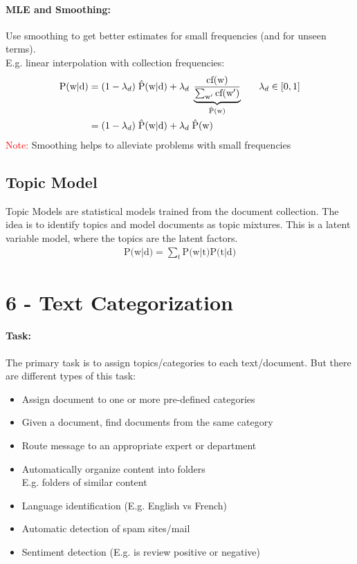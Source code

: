 \documentclass[a4paper,11pt]{article}
\newcommand{\msection}[1]{\section{#1}\vspace{-0.5mm}}
\newcommand{\cf}{\text{cf(w)}} %
\begin{document}
\begin{multicols}{2}
\paragraph{MLE and Smoothing:} Use smoothing to get better estimates for small frequencies (and for unseen terms).\\
E.g. linear interpolation with collection frequencies:
\begin{align*}
  \text{P(w$|$d)} &= (1 - \lambda_d) \; \hat{\text P}\text{(w$|$d)} + \lambda_d \; \underbrace{\frac{\cf}{\sum_{\text w'} \text{cf(w$'$)}}}_{\hat{\text P}(\text w)} \hspace{0.6cm} \lambda_d \in [0, 1] \\
                  &= (1 - \lambda_d) \; \hat{\text P}\text{(w$|$d)} + \lambda_d \; \hat{\text{P}} \text{(w)}
\end{align*}
\textcolor{red}{Note:} Smoothing helps to alleviate problems with small frequencies

\subsection{Topic Model}
Topic Models are statistical models trained from the document collection. The idea is to identify topics and model documents as topic mixtures. This is a latent variable model, where the topics are the latent factors. 
\begin{align*}
  \text{P(w$|$d)} = \sum_t \text{P(w$|$t)} \text{P(t$|$d)}
\end{align*}

\msection{6 - Text Categorization}
\paragraph{Task:} The primary task is to assign topics/categories to each text/document. But there are different types of this task:
\begin{itemize}
  \item Assign document to one or more pre-defined categories
  \item Given a document, find documents from the same category
  \item Route message to an appropriate expert or department
  \item Automatically organize content into folders\\
        E.g. folders of similar content
  \item Language identification (E.g. English vs French)
  \item Automatic detection of spam sites/mail
  \item Sentiment detection (E.g. is review positive or negative)
\end{itemize}


\end{multicols}
\end{document}
